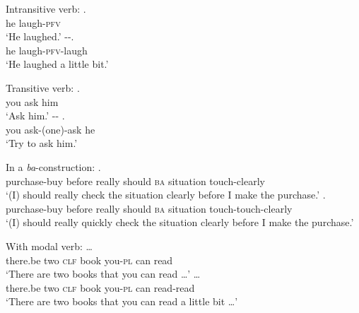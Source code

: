 \settowidth{}
\begin{sloppypar}
\ea\label{ex:syn-vi} Intransitive verb:
		\ea \gll {} .\\
		he laugh-\textsc{pfv}\\
		\glt `He laughed.'
		\ex\label{ex:xiaole} \gll {} --.\\
		he laugh-\textsc{pfv}-laugh\\
		\glt `He laughed a little bit.'
		\z
        
\ex Transitive verb:
		\ea \gll {}  .\\
		you ask him\\
		\glt `Ask him.'
		\ex \gll {} -- .\\
		you ask-(one)-ask he\\
		\glt `Try to ask him.'
		\z



\ex In a \textit{ba}-construction:
		\ea \gll {}      .\\
		purchase-buy before really should \textsc{ba} situation touch-clearly\\
		\glt `(I) should really check the situation clearly before I make the purchase.'
		\ex \gll {}      .\footnotemark\\
		purchase-buy before really should \textsc{ba} situation touch-touch-clearly\\ 
		\glt `(I) should really quickly check the situation clearly before I make the purchase.'
		\z
{}

\ex With modal verb:
		\ea \gll {}       \ldots\\
		there.be two \textsc{clf} book you-\textsc{pl} can read\\
		\glt `There are two books that you can read \ldots'
		\ex \gll {}       \ldots\\
		there.be two \textsc{clf} book you-\textsc{pl} can read-read\\ 
		\glt `There are two books that you can read a little bit \ldots'
		\z


\end{sloppypar}
